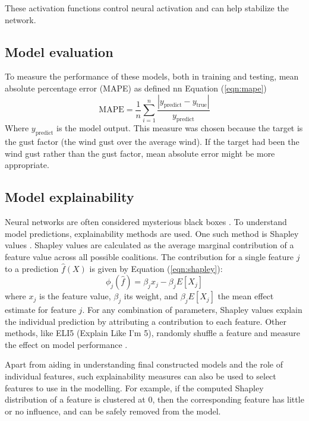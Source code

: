 These activation functions control neural activation and can help stabilize the network.
\subsection{Model evaluation}
To measure the performance of these models, both in training and testing, mean absolute percentage error (MAPE) as defined nn Equation (\ref{eqn:mape})
\begin{equation}
    \label{eqn:mape}
    \text{MAPE} = \frac{1}{n}\sum_{i=1}^n\frac{|y_{\mathrm{predict}} - y_{\mathrm{true}}|}{y_{\mathrm{predict}}}
\end{equation}
Where $y_{\text{predict}}$ is the model output. This measure was chosen because the target is the gust factor (the wind gust over the average wind). If the target had been the wind gust rather than the gust factor, mean absolute error might be more appropriate.

\subsection{Model explainability}
Neural networks are often considered mysterious black boxes \parencite{nn_black_box}. To understand model predictions, explainability methods are used. One such method is Shapley values \parencite{shapley_information}. Shapley values are calculated as the average marginal contribution of a feature value across all possible coalitions. The contribution for a single feature \(j\) to a prediction \(\hat{f}(X)\) is given by Equation (\ref{eqn:shapley}):
\begin{equation}
    \label{eqn:shapley}
    \phi_j(\hat{f}) = \beta_j x_j - \beta_j E[X_j]
\end{equation}
where \(x_j\) is the feature value, \(\beta_j\) its weight, and \(\beta_j E[X_j]\) the mean effect estimate for feature \(j\). For any combination of parameters, Shapley values explain the individual prediction by attributing a contribution to each feature. Other methods, like ELI5 (Explain Like I’m 5), randomly shuffle a feature and measure the effect on model performance \parencite{eli5_information}.

Apart from aiding in understanding final constructed models and the role of individual features, such explainability measures can also be used to select features to use in the modelling. For example, if the computed Shapley distribution of a feature is clustered at 0, then the corresponding feature has little or no influence, and can be safely removed from the model.